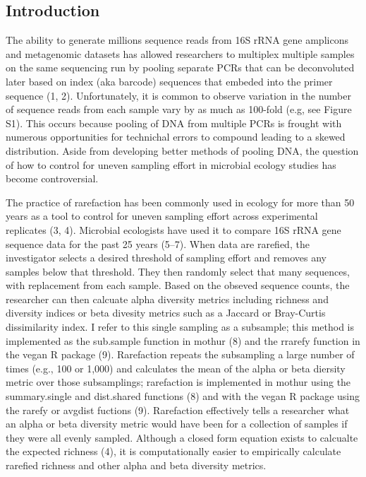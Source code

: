 \documentclass[
]{article}
\begin{document}
\newpage

\hypertarget{introduction}{%
\subsection{Introduction}\label{introduction}}

The ability to generate millions sequence reads from 16S rRNA gene
amplicons and metagenomic datasets has allowed researchers to multiplex
multiple samples on the same sequencing run by pooling separate PCRs
that can be deconvoluted later based on index (aka barcode) sequences
that embeded into the primer sequence (1, 2). Unfortunately, it is
common to observe variation in the number of sequence reads from each
sample vary by as much as 100-fold (e.g, see Figure S1). This occurs
because pooling of DNA from multiple PCRs is frought with numerous
opportunities for technichal errors to compound leading to a skewed
distribution. Aside from developing better methods of pooling DNA, the
question of how to control for uneven sampling effort in microbial
ecology studies has become controversial.

The practice of rarefaction has been commonly used in ecology for more
than 50 years as a tool to control for uneven sampling effort across
experimental replicates (3, 4). Microbial ecologists have used it to
compare 16S rRNA gene sequence data for the past 25 years (5--7). When
data are rarefied, the investigator selects a desired threshold of
sampling effort and removes any samples below that threshold. They then
randomly select that many sequences, with replacement from each sample.
Based on the obseved sequence counts, the researcher can then calcuate
alpha diversity metrics including richness and diversity indices or beta
divesity metrics such as a Jaccard or Bray-Curtis dissimilarity index. I
refer to this single sampling as a subsample; this method is implemented
as the sub.sample function in mothur (8) and the rrarefy function in the
vegan R package (9). Rarefaction repeats the subsampling a large number
of times (e.g., 100 or 1,000) and calculates the mean of the alpha or
beta diersity metric over those subsamplings; rarefaction is implemented
in mothur using the summary.single and dist.shared functions (8) and
with the vegan R package using the rarefy or avgdist fuctions (9).
Rarefaction effectively tells a researcher what an alpha or beta
diversity metric would have been for a collection of samples if they
were all evenly sampled. Although a closed form equation exists to
calcualte the expected richness (4), it is computationally easier to
empirically calculate rarefied richness and other alpha and beta
diversity metrics.
\end{document}
